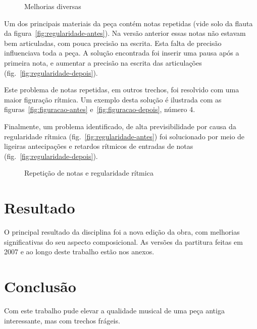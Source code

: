 \documentclass[10pt]{article}
\begin{document}
\begin{figure*}
  \centering

  \caption{Melhorias diversas}
  \label{fig:figuracao}
\end{figure*}

Um dos principais materiais da peça contém notas repetidas (vide solo
da flauta da figura~\ref{fig:regularidade-antes}). Na versão anterior
essas notas não estavam bem articuladas, com pouca precisão na
escrita. Esta falta de precisão influenciava toda a peça. A solução
encontrada foi inserir uma pausa após a primeira nota, e aumentar a
precisão na escrita das articulações
(fig.~\ref{fig:regularidade-depois}).

Este problema de notas repetidas, em outros trechos, foi resolvido com
uma maior figuração rítmica. Um exemplo desta solução é ilustrada com
as figuras~\ref{fig:figuracao-antes} e~\ref{fig:figuracao-depois},
número 4.

Finalmente, um problema identificado, de alta previsibilidade por
causa da regularidade rítmica (fig.~\ref{fig:regularidade-antes}) foi
solucionado por meio de ligeiras antecipações e retardos rítmicos de
entradas de notas (fig.~\ref{fig:regularidade-depois}).

\begin{figure*}
  \centering

  \caption{Repetição de notas e regularidade rítmica}
  \label{fig:regularidade}
\end{figure*}

\section{Resultado}
\label{sec:resultado}

O principal resultado da disciplina foi a nova edição da obra, com
melhorias significativas do seu aspecto composicional. As versões da
partitura feitas em 2007 e ao longo deste trabalho estão nos anexos.

\section{Conclusão}
\label{sec:conclusao}

Com este trabalho pude elevar a qualidade musical de uma peça antiga
interessante, mas com trechos frágeis.
\end{document}

